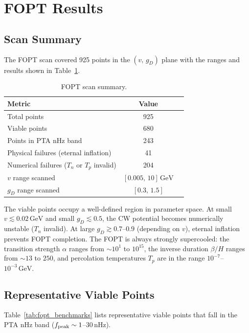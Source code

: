 \documentclass[a4paper,11pt]{article}
\newcommand{\GeV}{\,\text{GeV}}
\newcommand{\nHz}{\,\text{nHz}}
\begin{document}
\section{FOPT Results}

\subsection{Scan Summary}

The FOPT scan covered 925 points in the $(v,\,g_D)$ plane with the ranges and results shown in Table~\ref{tab:fopt_scan_summary}.

\begin{table}[htbp]
\centering
\caption{FOPT scan summary.}
\label{tab:fopt_scan_summary}
\begin{tabular}{lcc}
\toprule
Metric & Value \\
\midrule
Total points & 925 \\
Viable points & 680 \\
Points in PTA nHz band & 243 \\
Physical failures (eternal inflation) & 41 \\
Numerical failures ($T_n$ or $T_p$ invalid) & 204 \\
\midrule
$v$ range scanned & $[0.005,\,10]\GeV$ \\
$g_D$ range scanned & $[0.3,\,1.5]$ \\
\bottomrule
\end{tabular}
\end{table}

The viable points occupy a well-defined region in parameter space. At small $v \lesssim 0.02\GeV$ and small $g_D \lesssim 0.5$, the CW potential becomes numerically unstable ($T_n$ invalid). At large $g_D \gtrsim 0.7$--$0.9$ (depending on $v$), eternal inflation prevents FOPT completion. The FOPT is always strongly supercooled: the transition strength $\alpha$ ranges from $\sim 10^1$ to $10^{15}$, the inverse duration $\beta/H$ ranges from $\sim 13$ to $250$, and percolation temperatures $T_p$ are in the range $10^{-7}$--$10^{-3}\GeV$.

\subsection{Representative Viable Points}

Table~\ref{tab:fopt_benchmarks} lists representative viable points that fall in the PTA nHz band ($f_{\rm peak} \sim 1$--$30\nHz$).
\end{document}

